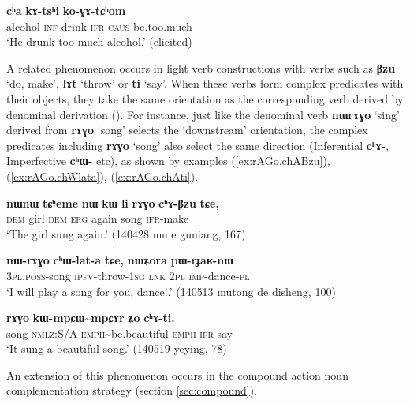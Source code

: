 \documentclass[oneside,a4paper,11pt]{article}
\newcommand{\ipa}[1]{\textbf{\phon#1}} %
\newcommand{\jpg}[2]{\ipa{#1} `#2'} %
\newcommand{\tld}{\textasciitilde{}}
\newcommand{\refb}[1]{(\ref{#1})}
\begin{document}
\begin{exe}
\ex 
\gll \ipa{cʰa} 	\ipa{kɤ-tsʰi} 	\ipa{ko-ɣɤ-tɕʰom} \\
alcohol \textsc{inf}-drink \textsc{ifr-caus}-be.too.much \\
\glt `He drunk too much alcohol.' (elicited)
\end{exe}

A related phenomenon occurs in light verb constructions with verbs such as \jpg{βzu}{do, make}, \jpg{lɤt}{throw} or \jpg{ti}{say}. When these verbs form complex predicates with their objects, they take the same orientation as the corresponding verb derived by denominal derivation (\citealt[1220]{jacques12incorp}). For instance, just like the denominal verb \jpg{nɯrɤɣo}{sing} derived from \jpg{rɤɣo}{song} selects the `downstream' orientation, the complex predicates including \jpg{rɤɣo}{song} also select the same direction (Inferential \ipa{cʰɤ-}, Imperfective \ipa{cʰɯ-} etc), as shown by examples \refb{ex:rAGo.chABzu}, \refb{ex:rAGo.chWlata}, \refb{ex:rAGo.chAti}.

\begin{exe}
\ex \label{ex:rAGo.chABzu}
\gll \ipa{nɯnɯ} 	\ipa{tɕʰeme} 	\ipa{nɯ} 	\ipa{kɯ} 	\ipa{li} 	\ipa{rɤɣo} 	\ipa{cʰɤ-βzu} 	\ipa{tɕe,} \\
\textsc{dem} girl \textsc{dem} \textsc{erg} again song \textsc{ifr}-make \\
\glt `The girl sung again.' (140428 mu e guniang, 167)
\end{exe}

\begin{exe}
\ex \label{ex:rAGo.chWlata}
\gll 
\ipa{nɯ-rɤɣo} 	\ipa{cʰɯ-lat-a} 	\ipa{tɕe,} 	\ipa{nɯʑora} 	\ipa{pɯ-rɟaʁ-nɯ} \\
\textsc{3pl.poss}-song \textsc{ipfv}-throw-\textsc{1sg} \textsc{lnk} \textsc{2pl} \textsc{imp}-dance-\textsc{pl} \\
\glt `I will play a song for you, dance!.' (140513 mutong de disheng, 100)
\end{exe}

\begin{exe}
\ex \label{ex:rAGo.chAti}
\gll 
\ipa{rɤɣo} 	\ipa{kɯ-mpɕɯ\tld{}mpɕɤr} 	\ipa{ʑo} 	\ipa{cʰɤ-ti.} \\
song \textsc{nmlz:S/A-emph}\tld{}be.beautiful \textsc{emph} \textsc{ifr}-say \\
\glt `It sung a beautiful song.' (140519 yeying, 78)
\end{exe}

An extension of this phenomenon occurs in the compound action noun complementation strategy (section \ref{sec:compound}).
\end{document}
